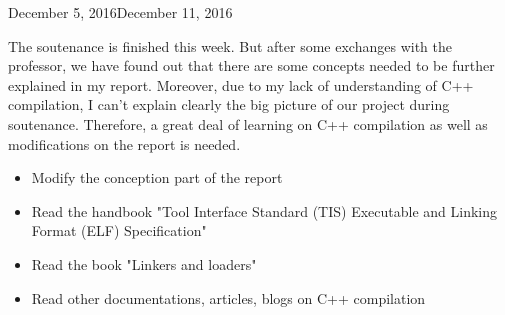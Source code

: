 \begin{fichesuivi}{December 5, 2016}{December 11, 2016}

   \begin{travaileffectue}
        The soutenance is finished this week. But after some exchanges with the professor,  we have found out that there are some concepts needed to be further explained in my report. Moreover, due to my lack of understanding of C++ compilation, I can't explain clearly the big picture of our project during soutenance. Therefore, a great deal of learning on C++ compilation as well as modifications on the report is needed.
   \end{travaileffectue}

   \begin{travailnoneffectue}
        \begin{itemize}
            \item Modify the conception part of the report
        \end{itemize}
   \end{travailnoneffectue}

 
   \begin{planification}
        \begin{itemize}
            \item Read the handbook "Tool Interface Standard (TIS)
                    Executable and Linking Format (ELF)
                    Specification"
            \item Read the book "Linkers and loaders"
            \item Read other documentations, articles, blogs on C++ compilation
        \end{itemize}
   \end{planification}
\end{fichesuivi}




